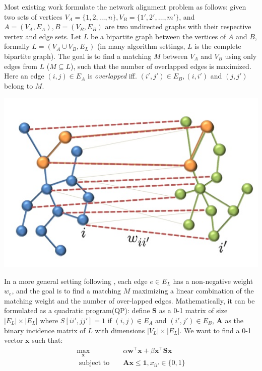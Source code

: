 \documentclass[11pt,letterpaper]{article}
\begin{document}
Most existing work formulate the network alignment problem as follows: given two sets of vertices $V_A = \{1, 2, \ldots, n\}, V_B = \{1', 2', \ldots, m'\}$, and $A = (V_A, E_A), B = (V_B, E_B)$ are two undirected graphs with their respective vertex and edge sets. Let $L$ be a bipartite graph between the vertices of $A$ and $B$, formally $L = (V_A \cup V_B, E_L)$ (in many algorithm settings, $L$ is the complete bipartite graph). The goal is to find a matching $M$ between $V_A$ and $V_B$ using only edges from $L$ ($M \subseteq L$), such that the number of overlapped edges is maximized. Here an edge $(i, j) \in E_A$ is \textit{overlapped} iff. $(i', j') \in E_B, (i, i')$ and $(j, j')$ belong to $M$.

\begin{center}
\includegraphics[scale = 0.4]{fig/matching}
\end{center}

In a more general setting following \cite{Singh2007}, each edge $e \in E_L$ has a non-negative weight $w_e$, and the goal is to find a matching $M$ maximizing a linear combination of the matching weight and the number of over-lapped edges. Mathematically, it can be formulated as a quadratic program(QP): define $\mathbf{S}$ as a 0-1 matrix of size $|E_L| \times |E_L|$ where $S[ii',  jj'] = 1$ if $(i, j) \in E_A$ and $(i', j') \in E_B$, $\mathbf{A}$ as the binary incidence matrix of $L$ with dimensions $|V_L| \times |E_L|$. We want to find a 0-1 vector $\mathbf{x}$ such that:
\begin{eqnarray*}
      \max_{\mathbf{x}} & & {\alpha \mathbf{w}^{\intercal}\mathbf{x} + \beta \mathbf{x}^{\intercal}\mathbf{S}\mathbf{x}} \\
      \text{ subject to  } & &  \mathbf{A}\mathbf{x} \leq \mathbf{1}, x_{ii'} \in \{0, 1\}
\end{eqnarray*}
\end{document}
